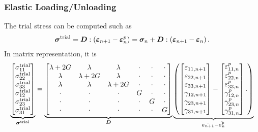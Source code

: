 \subsubsection{Elastic Loading/Unloading}
The trial stress can be computed such as
\begin{gather}\label{eq:j2_tsigma}
\bm{\sigma}^\text{trial}=\bm{D}:\left(\bm{\varepsilon}_{n+1}-\bm{\varepsilon}^p_n\right)=\bm{\sigma}_n+\bm{D}:\left(\bm{\varepsilon}_{n+1}-\bm{\varepsilon}_n\right).
\end{gather}
In matrix representation, it is
\begin{gather}
\underbrace{
\begin{bmatrix}
\sigma^\text{trial}_{11}\\
\sigma^\text{trial}_{22}\\
\sigma^\text{trial}_{33}\\
\sigma^\text{trial}_{12}\\
\sigma^\text{trial}_{23}\\
\sigma^\text{trial}_{31}
\end{bmatrix}}_{\bm{\sigma}^\text{trial}}
=
\underbrace{\begin{bmatrix}
\lambda+2G&\lambda&\lambda&\cdot&\cdot&\cdot\\
\lambda&\lambda+2G&\lambda&\cdot&\cdot&\cdot\\
\lambda&\lambda&\lambda+2G&\cdot&\cdot&\cdot\\
\cdot&\cdot&\cdot&G&\cdot&\cdot\\
\cdot&\cdot&\cdot&\cdot&G&\cdot\\
\cdot&\cdot&\cdot&\cdot&\cdot&G
\end{bmatrix}}_{\bm{D}}
\underbrace{\left(\begin{bmatrix}
\varepsilon_{11,n+1}\\
\varepsilon_{22,n+1}\\
\varepsilon_{33,n+1}\\
     \gamma_{12,n+1}\\
     \gamma_{23,n+1}\\
     \gamma_{31,n+1}
\end{bmatrix}-\begin{bmatrix}
\varepsilon^p_{11,n}\\
\varepsilon^p_{22,n}\\
\varepsilon^p_{33,n}\\
     \gamma^p_{12,n}\\
     \gamma^p_{23,n}\\
     \gamma^p_{31,n}
\end{bmatrix}.
\right)}_{\dot{\bm{\varepsilon}_{n+1}}-\dot{\bm{\varepsilon}^p_n}}
\end{gather}

